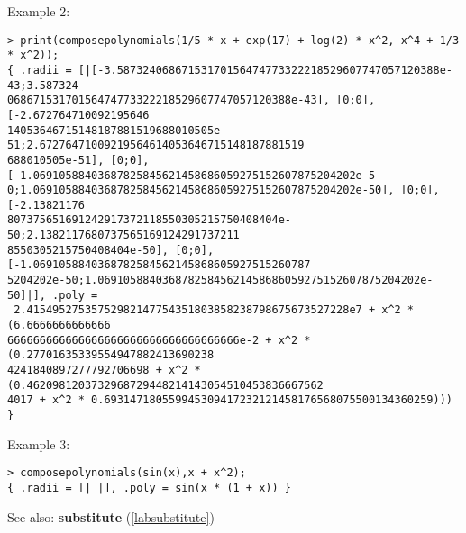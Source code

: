 \noindent Example 2: 
\begin{center}\begin{minipage}{15cm}\begin{Verbatim}[frame=single]
> print(composepolynomials(1/5 * x + exp(17) + log(2) * x^2, x^4 + 1/3 * x^2));
{ .radii = [|[-3.58732406867153170156474773322218529607747057120388e-43;3.587324
06867153170156474773322218529607747057120388e-43], [0;0], [-2.672764710092195646
14053646715148187881519688010505e-51;2.67276471009219564614053646715148187881519
688010505e-51], [0;0], [-1.06910588403687825845621458686059275152607875204202e-5
0;1.06910588403687825845621458686059275152607875204202e-50], [0;0], [-2.13821176
807375651691242917372118550305215750408404e-50;2.1382117680737565169124291737211
8550305215750408404e-50], [0;0], [-1.0691058840368782584562145868605927515260787
5204202e-50;1.06910588403687825845621458686059275152607875204202e-50]|], .poly =
 2.41549527535752982147754351803858238798675673527228e7 + x^2 * (6.6666666666666
666666666666666666666666666666666666e-2 + x^2 * (0.27701635339554947882413690238
4241840897277792706698 + x^2 * (0.4620981203732968729448214143054510453836667562
4017 + x^2 * 0.693147180559945309417232121458176568075500134360259))) }
\end{Verbatim}
\end{minipage}\end{center}
\noindent Example 3: 
\begin{center}\begin{minipage}{15cm}\begin{Verbatim}[frame=single]
> composepolynomials(sin(x),x + x^2);
{ .radii = [| |], .poly = sin(x * (1 + x)) }
\end{Verbatim}
\end{minipage}\end{center}
See also: \textbf{substitute} (\ref{labsubstitute})
